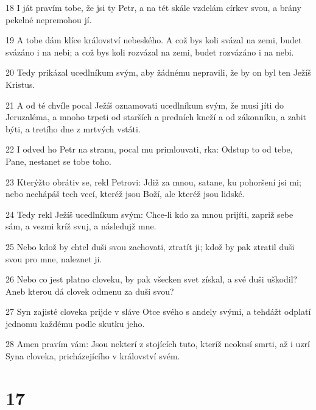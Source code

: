 \par 18 I ját pravím tobe, že jsi ty Petr, a na tét skále vzdelám církev svou, a brány pekelné nepremohou jí.
\par 19 A tobe dám klíce království nebeského. A což bys koli svázal na zemi, budet svázáno i na nebi; a což bys koli rozvázal na zemi, budet rozvázáno i na nebi.
\par 20 Tedy prikázal ucedlníkum svým, aby žádnému nepravili, že by on byl ten Ježíš Kristus.
\par 21 A od té chvíle pocal Ježíš oznamovati ucedlníkum svým, že musí jíti do Jeruzaléma, a mnoho trpeti od starších a predních kneží a od zákonníku, a zabit býti, a tretího dne z mrtvých vstáti.
\par 22 I odved ho Petr na stranu, pocal mu primlouvati, rka: Odstup to od tebe, Pane, nestanet se tobe toho.
\par 23 Kterýžto obrátiv se, rekl Petrovi: Jdiž za mnou, satane, ku pohoršení jsi mi; nebo nechápáš tech vecí, kteréž jsou Boží, ale kteréž jsou lidské.
\par 24 Tedy rekl Ježíš ucedlníkum svým: Chce-li kdo za mnou prijíti, zapriž sebe sám, a vezmi kríž svuj, a následujž mne.
\par 25 Nebo kdož by chtel duši svou zachovati, ztratít ji; kdož by pak ztratil duši svou pro mne, naleznet ji.
\par 26 Nebo co jest platno cloveku, by pak všecken svet získal, a své duši uškodil? Aneb kterou dá clovek odmenu za duši svou?
\par 27 Syn zajisté cloveka prijde v sláve Otce svého s andely svými, a tehdážt odplatí jednomu každému podle skutku jeho.
\par 28 Amen pravím vám: Jsou nekterí z stojících tuto, kteríž neokusí smrti, až i uzrí Syna cloveka, pricházejícího v království svém.

\chapter{17}


